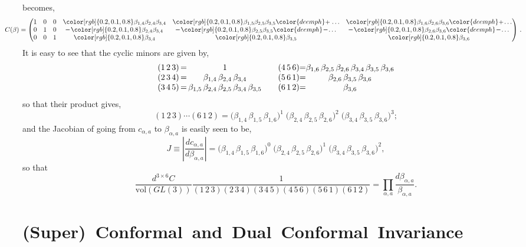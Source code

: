 \documentclass[12pt,hyperref,compress]{JHEP3}
\newcommand{\eq}[1]{\begin{equation}#1\end{equation}}
\newcommand{\eqs}[1]{\begin{equation}\begin{split}#1\end{split}\end{equation}}
\newcommand{\mi}{{\rm\rule[2.4pt]{6pt}{0.65pt}}}
\newcommand{\pl}{\hspace{0.5pt}\text{{\small+}}\hspace{-0.5pt}}
\begin{document}
{becomes,
{\small\eqs{\hspace{-1cm}C(\beta)&=\left(
\begin{array}{@{}cccccc@{}}
 1 & 0 & 0 & {\color[rgb]{0.2,0.1,0.8}\beta_{1,4}}\beta_{2,4}\beta_{3,4}&{\color[rgb]{0.2,0.1,0.8}\beta_{1,5}}\beta_{2,5}\beta_{3,5}{\color{deemph}\pl\,\ldots}
 &{\color[rgb]{0.2,0.1,0.8}\beta_{1,6}}\beta_{2,6}\beta_{3,6}{\color{deemph}\pl\ldots}\\
 0 & 1 & 0 & \mi\,{\color[rgb]{0.2,0.1,0.8}\beta_{2,4}} \beta_{3,4}&\mi\,{\color[rgb]{0.2,0.1,0.8}\beta_{2,5}}\beta_{3,5}{\color{deemph}\,\mi\ldots}&\mi\,{\color[rgb]{0.2,0.1,0.8}\beta_{2,6}}\beta_{3,6}{\color{deemph}\,\mi\ldots}\\
 0 & 0 & 1 & {\color[rgb]{0.2,0.1,0.8}\beta_{3,4}} & {\color[rgb]{0.2,0.1,0.8}\beta_{3,5}} &{\color[rgb]{0.2,0.1,0.8}\beta_{3,6}}
\end{array}
\right)\,.}}
It is easy to see that the cyclic minors are given by,
\eq{\begin{array}{l@{$\,=\,$}c@{$\qquad$}l@{$=$}c}(1\,2\,3)&1&(4\,5\,6)&\beta_{1,6}\,\beta_{2,5}\,\beta_{2,6}\,\beta_{3,4}\,\beta_{3,5}\,\beta_{3,6}\\(2\,3\,4)&\beta_{1,4}\,\beta_{2,4}\,\beta_{3,4}&(5\,6\,1)&\beta_{2,6}\,\beta_{3,5}\,\beta_{3,6}\\(3\,4\,5)&\beta_{1,5}\,\beta_{2,4}\,\beta_{2,5}\,\beta_{3,4}\,\beta_{3,5}&(6\,1\,2)&\beta_{3,6}\end{array}}
so that their product gives,
\eq{(1\,2\,3)\cdots(6\,1\,2)=\big(\beta_{1,4}\,\beta_{1,5}\,\beta_{1,6}\big)^1\;\big(\beta_{2,4}\,\beta_{2,5}\,\beta_{2,6}\big)^2\;\big(\beta_{3,4}\,\beta_{3,5}\,\beta_{3,6}\big)^3;}
and the Jacobian of going from $c_{\alpha,a}$ to $\beta_{\alpha,a}$ is easily seen to be,
\eq{J\equiv\left|\frac{dc_{\alpha,a}}{d\beta_{\alpha,a}}\right|=\big(\beta_{1,4}\,\beta_{1,5}\,\beta_{1,6}\big)^0\;\big(\beta_{2,4}\,\beta_{2,5}\,\beta_{2,6}\big)^1\;\big(\beta_{3,4}\,\beta_{3,5}\,\beta_{3,6}\big)^2,}
so that
\eq{\frac{d^{3\times 6}C}{\mathrm{vol}(GL(3))}\frac{1}{(1\,2\,3)(2\,3\,4)(3\,4\,5)(4\,5\,6)(5\,6\,1)(6\,1\,2)}=\prod_{\alpha,a}\frac{d\beta_{\alpha,a}}{\beta_{\alpha,a}}.}










\section{\mbox{(Super) Conformal and Dual Conformal Invariance}}\label{superconformal_and_dual_superconformal_invariance}

}
\end{document}
